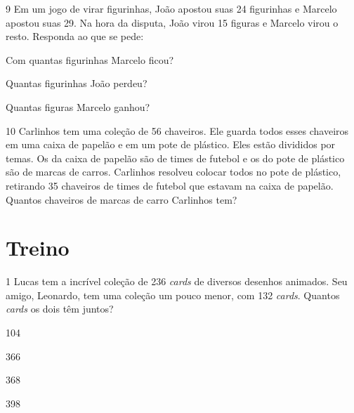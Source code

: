 
\pagebreak
\num{9} Em um jogo de virar figurinhas, João apostou suas 24 figurinhas e Marcelo apostou suas 29. Na hora da disputa, João virou 15 figuras e Marcelo virou o resto. Responda ao que se pede:

\begin{escolha}
\item Com quantas figurinhas Marcelo ficou?

\item Quantas figurinhas João perdeu?

\item Quantas figuras Marcelo ganhou?
\end{escolha}

\num{10} Carlinhos tem uma coleção de 56 chaveiros. Ele guarda todos esses
chaveiros em uma caixa de papelão e em um pote de plástico. Eles estão
divididos por temas. Os da caixa de papelão são de times de futebol e os
do pote de plástico são de marcas de carros. Carlinhos resolveu colocar
todos no pote de plástico, retirando 35 chaveiros de times de futebol que estavam na
caixa de papelão. Quantos chaveiros de marcas de
carro Carlinhos tem?


\pagebreak
\section*{Treino}

\num{1} Lucas tem a incrível coleção de 236 \emph{cards} de diversos desenhos
animados. Seu amigo, Leonardo, tem uma coleção um pouco menor, com 132
\emph{cards}. Quantos \emph{cards} os dois têm juntos?

\begin{escolha}[itemsep=-5pt]
\item 104

\item 366

\item 368

\item 398
\end{escolha}


